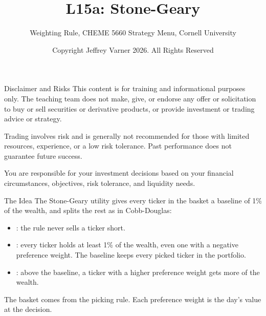 \documentclass[aspectratio=169,11pt]{beamer}
\title{\texorpdfstring{{\vnheavy L15a}}{L15a}: Stone-Geary}
\subtitle{Weighting Rule, CHEME 5660 Strategy Menu, Cornell University}
\author{Copyright Jeffrey Varner 2026. All Rights Reserved}
\begin{document}
\vntitlepage

\begin{frame}{Disclaimer and Risks}
  \vspace{0.6em}
  \textbf{} This content is for training and informational
  purposes only. The teaching team does not make, give, or endorse any offer or
  solicitation to buy or sell securities or derivative products, or provide
  investment or trading advice or strategy.

  \vspace{1.1em}
  \textbf{} Trading involves risk and is generally not recommended for
  those with limited resources, experience, or a low risk tolerance. Past
  performance does not guarantee future success.

  \vspace{1.1em}
  \textbf{} You are responsible for your investment decisions
  based on your financial circumstances, objectives, risk tolerance, and
  liquidity needs.
\end{frame}

\begin{frame}{The Idea}
  \vspace{0.3em}
  The Stone-Geary utility gives every ticker in the basket a baseline of 1\% of the wealth, and splits the
  rest as in Cobb-Douglas:
  \begin{itemize}\setlength{\itemsep}{0.5em}
    \item {}: the rule never sells a ticker short.
    \item {}: every ticker holds at least 1\% of the wealth, even one with a negative preference weight. The baseline keeps every picked ticker in the portfolio.
    \item {}: above the baseline, a ticker with a higher preference weight gets more of the wealth.
  \end{itemize}

  \vspace{0.5em}
  The basket comes from the picking rule. Each preference weight is the day's value at the decision.
\end{frame}
\end{document}
